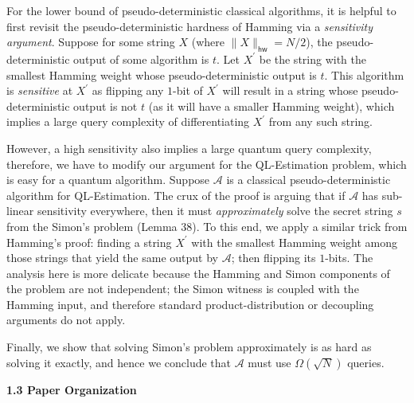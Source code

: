 For the lower bound of pseudo-deterministic classical algorithms,
it is helpful to first revisit the pseudo-deterministic hardness of Hamming via a \emph{sensitivity argument}. Suppose for some string $X$ (where $\|X\|_{\mathsf{hw}}=N/2$), the pseudo-deterministic output of some algorithm is $t$. Let $X^{\prime}$ be the string with the smallest Hamming weight whose pseudo-deterministic output is $t$. This algorithm is \emph{sensitive} at $X^{\prime}$ as flipping any $1$-bit of $X^{\prime}$ will result in a string whose pseudo-deterministic output is not $t$ (as it will have a smaller Hamming weight), which implies a large query complexity of differentiating $X^{\prime}$ from any such string.\par




However, a high sensitivity also implies a large quantum query complexity, therefore, we have to modify our argument for the QL-Estimation problem, which is easy for a quantum algorithm. Suppose $\mathcal{A}$ is a classical pseudo-deterministic algorithm for QL-Estimation. The crux of the proof is arguing that if $\mathcal{A}$ has sub-linear sensitivity everywhere, then it must \emph{approximately} solve the secret string $s$ from the Simon’s problem (Lemma 38).
To this end, we apply a similar trick from Hamming’s proof: finding a string $X^{\prime}$ with the smallest Hamming weight among those strings that yield the same output by $\mathcal{A}$; then flipping its $1$-bits. The analysis here is more delicate because the Hamming and Simon components of the problem are not independent; the Simon witness is coupled with the Hamming input, and therefore standard product-distribution or decoupling arguments do not apply.\par




Finally, we show that solving Simon’s problem approximately is as hard as solving it exactly, and hence we conclude that $\mathcal{A}$ must use $\Omega(\sqrt{N})$ queries.\par






\par\medskip\noindent\textbf{
1.3 Paper Organization}\par





